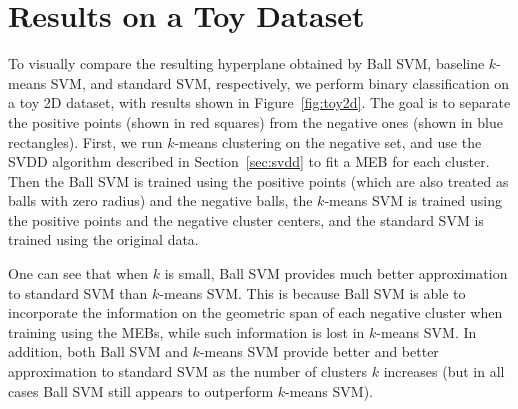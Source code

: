 \documentclass[12pt]{article}
\begin{document}
\section{Results on a Toy Dataset}
To visually compare the resulting hyperplane obtained by Ball SVM, baseline $k$-means SVM, and standard SVM, respectively,  we perform binary classification on a toy 2D dataset, with results shown in Figure~\ref{fig:toy2d}. The goal is to separate the positive points (shown in red squares) from the negative ones (shown in blue rectangles). First, we run $k$-means clustering on the negative set, and use the SVDD algorithm described in Section~\ref{sec:svdd} to fit a MEB for each cluster. Then the Ball SVM is trained using the positive points (which are also treated as balls with zero radius) and the negative balls, the $k$-means SVM is trained using the positive points and the negative cluster centers, and the standard SVM is trained using the original data. 

One can see that when $k$ is small, Ball SVM provides much better approximation to standard SVM than $k$-means SVM. This is because Ball SVM is able to incorporate the information on the geometric span of each negative cluster when training using the MEBs, while such information is lost in $k$-means SVM. In addition, both Ball SVM and $k$-means SVM provide better and better approximation to standard SVM as the number of clusters $k$ increases (but in all cases Ball SVM still appears to outperform $k$-means SVM).
\end{document}
